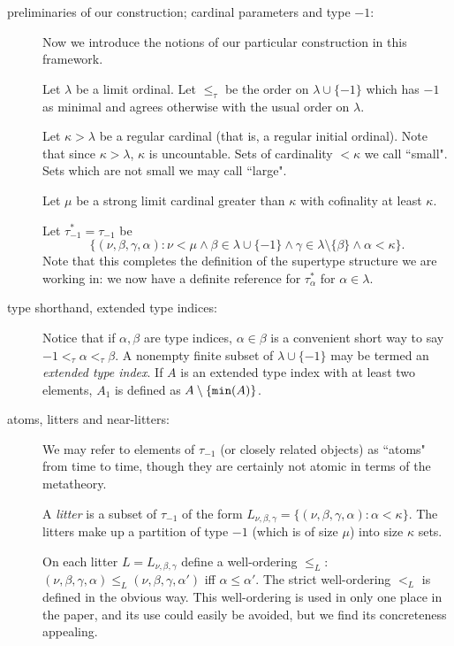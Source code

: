 \documentclass[112pt]{article}
\begin{document}
\begin{description}


\item[preliminaries of our construction;  cardinal parameters and type $-1$:]Now we introduce the notions of our particular construction in this framework.

Let $\lambda$ be a limit ordinal.  Let $\leq_\tau$ be the order on $\lambda \cup \{-1\}$ which has $-1$ as minimal and agrees otherwise with the usual order on $\lambda$.

Let $\kappa>\lambda$ be a regular cardinal (that is, a regular initial ordinal).  Note that since $\kappa>\lambda$, $\kappa$ is uncountable.  Sets of cardinality $<\kappa$ we call ``small".  Sets which are not small we may call ``large".

Let $\mu$ be a strong limit cardinal greater than $\kappa$ with cofinality at least $\kappa$.

Let $\tau^*_{-1}=\tau_{-1}$ be $$\{(\nu,\beta,\gamma,\alpha):\nu<\mu \wedge  \beta \in \lambda\cup \{-1\} \wedge \gamma \in \lambda \setminus \{\beta\}\wedge \alpha<\kappa\}.$$  Note that this completes the definition of the supertype structure we are working in:  we now have a definite reference
for $\tau^*_\alpha$ for $\alpha\in \lambda$.





\item[type shorthand, extended type indices:]  Notice that if $\alpha,\beta$ are type indices, $\alpha\in \beta$ is a convenient short way to say $-1 <_\tau \alpha <_\tau \beta$.   A nonempty finite subset of $\lambda \cup \{-1\}$ may be termed an {\em extended type index}.  If $A$ is an extended type index with at least two elements, $A_1$ is defined as $A \setminus \{{\tt min}(A)\}$.

\item[atoms, litters and near-litters:]  

We may refer to elements of $\tau_{-1}$ (or closely related objects) as ``atoms" from time to time, though they are certainly not atomic in terms of the metatheory.

A {\em litter\/} is a subset of $\tau_{-1}$ of the form $L_{\nu,\beta,\gamma} = \{(\nu,\beta,\gamma,\alpha):\alpha<\kappa\}$.  The litters make up a partition of type $-1$
(which is of size $\mu$) into size $\kappa$ sets.

On each litter $L =  L_{\nu,\beta,\gamma}$ define a well-ordering $\leq_L$:  $(\nu,\beta,\gamma,\alpha) \leq_L (\nu,\beta,\gamma,\alpha')$  iff $\alpha\leq \alpha'$.
The strict well-ordering $<_L$ is defined in the obvious way.  This well-ordering is used in only one place in the paper, and its use could easily be avoided, but we find its concreteness appealing.


\end{description}
\end{document}
